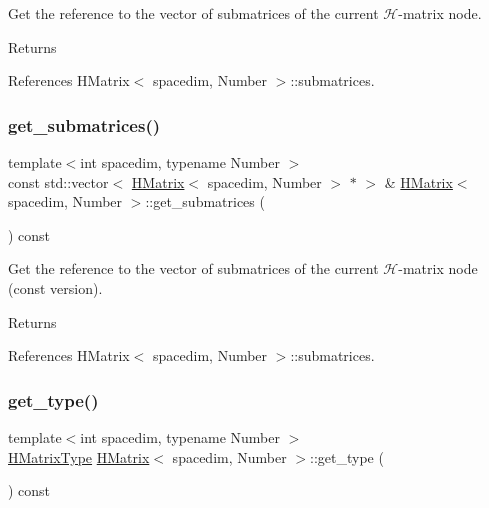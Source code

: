 Get the reference to the vector of submatrices of the current $\mathcal{H}$-\/matrix node. \begin{DoxyReturn}{Returns}

\end{DoxyReturn}


References H\+Matrix$<$ spacedim, Number $>$\+::submatrices.

\mbox{\label{classHMatrix_a8f8e9bc437ab86296d78950081ea34cd}} 
\subsubsection{\texorpdfstring{get\+\_\+submatrices()}{get\_submatrices()}\hspace{0.1cm}{\footnotesize\ttfamily [2/2]}}
{\footnotesize\ttfamily template$<$int spacedim, typename Number $>$ \\
const std\+::vector$<$ \hyperlink{classHMatrix}{H\+Matrix}$<$ spacedim, Number $>$ $\ast$ $>$ \& \hyperlink{classHMatrix}{H\+Matrix}$<$ spacedim, Number $>$\+::get\+\_\+submatrices (\begin{DoxyParamCaption}{ }\end{DoxyParamCaption}) const}

Get the reference to the vector of submatrices of the current $\mathcal{H}$-\/matrix node (const version). \begin{DoxyReturn}{Returns}

\end{DoxyReturn}


References H\+Matrix$<$ spacedim, Number $>$\+::submatrices.

\mbox{\label{classHMatrix_aadea9fa59f420d22b3b1c939f6b573cc}} 
\subsubsection{\texorpdfstring{get\+\_\+type()}{get\_type()}}
{\footnotesize\ttfamily template$<$int spacedim, typename Number $>$ \\
\hyperlink{hmatrix_8h_ac04719e202c88f36e4533fe1d326a494}{H\+Matrix\+Type} \hyperlink{classHMatrix}{H\+Matrix}$<$ spacedim, Number $>$\+::get\+\_\+type (\begin{DoxyParamCaption}{ }\end{DoxyParamCaption}) const}

